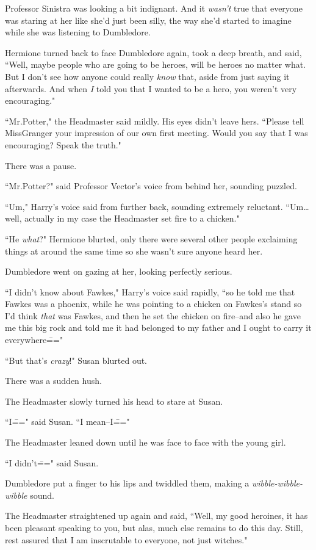 Professor Sinistra was looking a bit indignant. And it \emph{wasn't} true that everyone was staring at her like she'd just been silly, the way she'd started to imagine while she was listening to Dumbledore.

Hermione turned back to face Dumbledore again, took a deep breath, and said, ``Well, maybe people who are going to be heroes, will be heroes no matter what. But I don't see how anyone could really \emph{know} that, aside from just saying it afterwards. And when \emph{I} told you that I wanted to be a hero, you weren't very encouraging."

``Mr.\?Potter," the Headmaster said mildly. His eyes didn't leave hers. ``Please tell Miss\?Granger your impression of our own first meeting. Would you say that I was encouraging? Speak the truth."

There was a pause.

``Mr.\?Potter?" said Professor Vector's voice from behind her, sounding puzzled.

``Um," Harry's voice said from further back, sounding extremely reluctant. ``Um{\ldots} well, actually in my case the Headmaster set fire to a chicken."

``He \emph{what}?" Hermione blurted, only there were several other people exclaiming things at around the same time so she wasn't sure anyone heard her.

Dumbledore went on gazing at her, looking perfectly serious.

``I didn't know about Fawkes," Harry's voice said rapidly, ``so he told me that Fawkes was a phoenix, while he was pointing to a chicken on Fawkes's stand so I'd think \emph{that} was Fawkes, and then he set the chicken on fire\---and also he gave me this big rock and told me it had belonged to my father and I ought to carry it everywhere\==="

``But that's \emph{crazy}!" Susan blurted out.

There was a sudden hush.

The Headmaster slowly turned his head to stare at Susan.

``I\===" said Susan. ``I mean\---I\==="

The Headmaster leaned down until he was face to face with the young girl.

``I didn't\===" said Susan.

Dumbledore put a finger to his lips and twiddled them, making a \emph{wibble-wibble-wibble} sound.

The Headmaster straightened up again and said, ``Well, my good heroines, it has been pleasant speaking to you, but alas, much else remains to do this day. Still, rest assured that I am inscrutable to everyone, not just witches."

